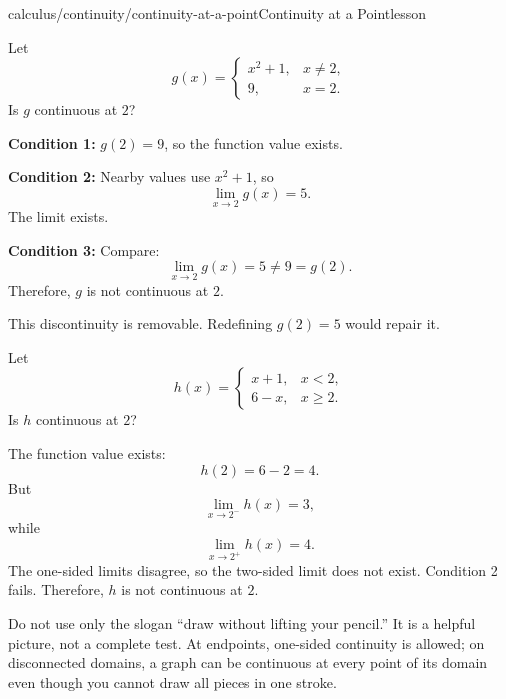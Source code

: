 \begin{webpage}{calculus/continuity/continuity-at-a-point}{Continuity at a Point}{lesson}
\begin{bgexample}[title={A limit exists but continuity fails}]
Let
\[
  g(x)=
  \begin{cases}
    x^2+1,&x\ne2,\\
    9,&x=2.
  \end{cases}
\]
Is \(g\) continuous at \(2\)?

\begin{bgsolution}
\textbf{Condition 1:} \(g(2)=9\), so the function value exists.

\textbf{Condition 2:} Nearby values use \(x^2+1\), so
\[
  \lim_{x\to2}g(x)=5.
\]
The limit exists.

\textbf{Condition 3:} Compare:
\[
  \lim_{x\to2}g(x)=5\ne9=g(2).
\]
Therefore, \(g\) is not continuous at \(2\).

This discontinuity is removable. Redefining \(g(2)=5\) would repair it.
\end{bgsolution}
\end{bgexample}

\begin{bgexample}[title={Continuity fails because no two-sided limit exists}]
Let
\[
  h(x)=
  \begin{cases}
    x+1,&x<2,\\
    6-x,&x\ge2.
  \end{cases}
\]
Is \(h\) continuous at \(2\)?

\begin{bgsolution}
The function value exists:
\[
  h(2)=6-2=4.
\]
But
\[
  \lim_{x\to2^-}h(x)=3,
\]
while
\[
  \lim_{x\to2^+}h(x)=4.
\]
The one-sided limits disagree, so the two-sided limit does not exist. Condition 2 fails. Therefore, \(h\) is not continuous at \(2\).
\end{bgsolution}
\end{bgexample}

\begin{bgexamnote}
Do not use only the slogan ``draw without lifting your pencil.'' It is a helpful picture, not a complete test. At endpoints, one-sided continuity is allowed; on disconnected domains, a graph can be continuous at every point of its domain even though you cannot draw all pieces in one stroke.
\end{bgexamnote}
\end{webpage}

